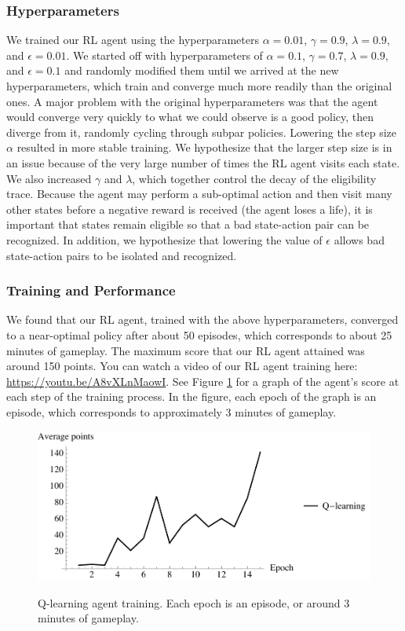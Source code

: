 \documentclass{article}
\begin{document}
\subsubsection{Hyperparameters}
We trained our RL agent using the hyperparameters $\alpha = 0.01$, $\gamma = 0.9$, $\lambda = 0.9$, and $\epsilon = 0.01$.  We started off with hyperparameters of $\alpha = 0.1$, $\gamma = 0.7$, $\lambda = 0.9$, and $\epsilon = 0.1$ and randomly modified them until we arrived at the new hyperparameters, which train and converge much more readily than the original ones.  A major problem with the original hyperparameters was that the agent would converge very quickly to what we could observe is a good policy, then diverge from it, randomly cycling through subpar policies.  Lowering the step size $\alpha$ resulted in more stable training.  We hypothesize that the larger step size is in an issue because of the very large number of times the RL agent visits each state.  We also increased $\gamma$ and $\lambda$, which together control the decay of the eligibility trace.  Because the agent may perform a sub-optimal action and then visit many other states before a negative reward is received (the agent loses a life), it is important that states remain eligible so that a bad state-action pair can be recognized.  In addition, we hypothesize that lowering the value of $\epsilon$ allows bad state-action pairs to be isolated and recognized.
\subsubsection{Training and Performance}
We found that our RL agent, trained with the above hyperparameters, converged to a near-optimal policy after about 50 episodes, which corresponds to about 25 minutes of gameplay.  The maximum score that our RL agent attained was around 150 points.  You can watch a video of our RL agent training here: \href{https://youtu.be/A8vXLnMaowI}{https://youtu.be/A8vXLnMaowI}.  See Figure \ref{qlearn:train} for a graph of the agent's score at each step of the training process.  In the figure, each epoch of the graph is an episode, which corresponds to approximately 3 minutes of gameplay.

\begin{figure}
  \centering
  \caption{Q-learning agent training.  Each epoch is an episode, or around 3 minutes of gameplay.}
  \includegraphics[width=120mm]{ql_reward.pdf}
  \label{qlearn:train}
\end{figure}
\end{document}
